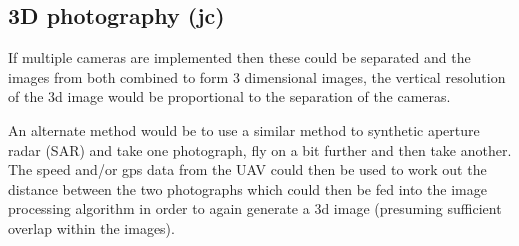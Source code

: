 \subsection{3D photography (jc)}

If multiple cameras are implemented then these could be separated and the images from both combined to form 3 dimensional images, the vertical resolution of the 3d image would be proportional to the separation of the cameras.

An alternate method would be to use a similar method to synthetic aperture radar (SAR) and take one photograph, fly on a bit further and then take another. The speed and/or gps data from the UAV could then be used to work out the distance between the two photographs which could then be fed into the image processing algorithm in order to again generate a 3d image (presuming sufficient overlap within the images).



